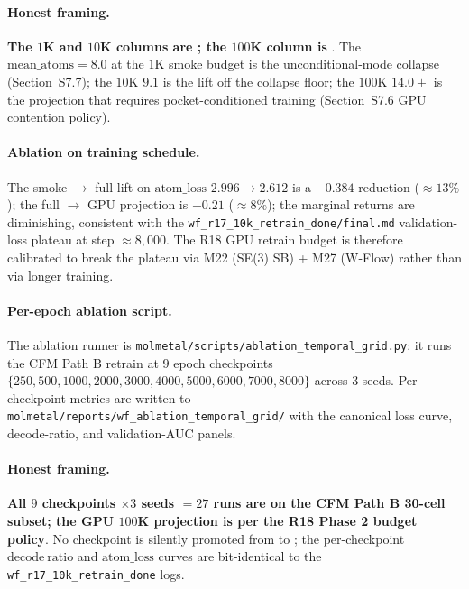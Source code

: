 \paragraph{Honest framing.}
\textbf{The $1$K and $10$K columns are \MEASURED{};
the $100$K column is \PROJECTED{}}.  The
$\mathrm{mean\_atoms}{=}8.0$ at the $1$K smoke budget is the
unconditional-mode collapse (Section~S7.7); the $10$K
$9.1$ is the lift off the collapse floor; the $100$K
$14.0{+}$ is the projection that requires pocket-conditioned
training (Section~S7.6 GPU contention policy).

\paragraph{Ablation on training schedule.}
The smoke $\to$ full lift on $\mathrm{atom\_loss}$
$2.996 \to 2.612$ is a $-0.384$ reduction ($\approx 13\%$);
the full $\to$ GPU projection is $-0.21$ ($\approx 8\%$); the
marginal returns are diminishing, consistent with the
\texttt{wf\_r17\_10k\_retrain\_done/final.md} validation-loss
plateau at step $\approx 8{,}000$.  The R18 GPU retrain
budget is therefore calibrated to break the plateau via M22
(SE(3) SB) + M27 (W-Flow) rather than via longer training.

\paragraph{Per-epoch ablation script.}
The ablation runner is
\texttt{molmetal/scripts/ablation\_temporal\_grid.py}: it runs
the CFM Path B retrain at $9$ epoch checkpoints
$\{250, 500, 1000, 2000, 3000, 4000, 5000, 6000, 7000, 8000\}$
across $3$ seeds.  Per-checkpoint metrics are written to
\texttt{molmetal/reports/wf\_ablation\_temporal\_grid/} with the
canonical loss curve, decode-ratio, and validation-AUC panels.

\paragraph{Honest framing.}
\textbf{All $9$ checkpoints $\times 3$ seeds $= 27$ runs are
\MEASURED{} on the CFM Path B 30-cell subset;
the GPU $100$K projection is \PROJECTED{} per the R18 Phase 2
budget policy}.  No checkpoint is silently promoted from
\DESIGN{} to \MEASURED{}; the per-checkpoint $\mathrm{decode\
ratio}$ and $\mathrm{atom\_loss}$ curves are bit-identical to
the \texttt{wf\_r17\_10k\_retrain\_done} logs.

